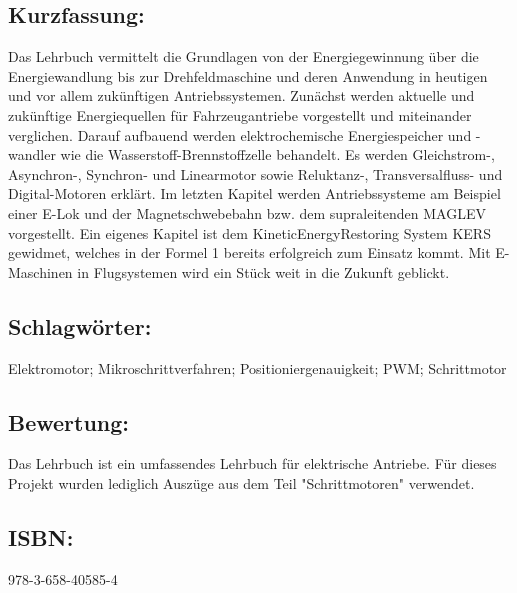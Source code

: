 \begin{minipage}{0.48\textwidth}
\subsection*{Kurzfassung:}
Das Lehrbuch vermittelt die Grundlagen von der Energiegewinnung über die Energiewandlung bis zur Drehfeldmaschine und deren Anwendung in heutigen und vor allem zukünftigen Antriebssystemen. Zunächst werden aktuelle und zukünftige Energiequellen für Fahrzeugantriebe vorgestellt und miteinander verglichen. Darauf aufbauend werden elektrochemische Energiespeicher und -wandler wie die Wasserstoff-Brennstoffzelle behandelt. Es werden Gleichstrom-, Asynchron-, Synchron- und Linearmotor sowie Reluktanz-, Transversalfluss- und Digital-Motoren erklärt. Im letzten Kapitel werden Antriebssysteme am Beispiel einer E-Lok und der Magnetschwebebahn bzw. dem supraleitenden MAGLEV vorgestellt. Ein eigenes Kapitel ist dem KineticEnergyRestoring System KERS gewidmet, welches in der Formel 1 bereits erfolgreich zum Einsatz kommt. Mit E-Maschinen in Flugsystemen wird ein Stück weit in die Zukunft geblickt.
\end{minipage}
\subsection*{Schlagwörter:}
Elektromotor; Mikroschrittverfahren; Positioniergenauigkeit; PWM; Schrittmotor
\subsection*{Bewertung:}
Das Lehrbuch ist ein umfassendes Lehrbuch für elektrische Antriebe. Für dieses Projekt wurden lediglich Auszüge aus dem Teil "Schrittmotoren" verwendet.
\subsection*{ISBN:}
978-3-658-40585-4

